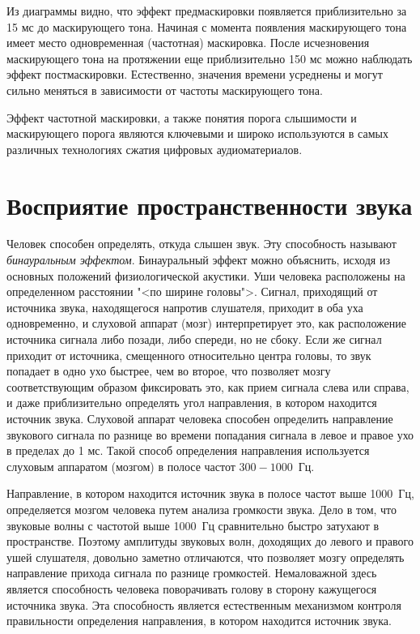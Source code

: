 \documentclass[oneside, final, 14pt]{extreport}
\begin{document}
Из диаграммы видно, что эффект предмаскировки появляется приблизительно за 15 мс до маскирующего тона. Начиная с момента появления маскирующего тона имеет место одновременная (частотная) маскировка. После исчезновения маскирующего тона на протяжении еще приблизительно 150 мс можно наблюдать эффект постмаскировки. Естественно, значения времени усреднены и могут сильно меняться в зависимости от частоты маскирующего тона.

Эффект частотной маскировки, а также понятия порога слышимости и маскирующего порога являются ключевыми и широко используются в самых различных технологиях сжатия цифровых аудиоматериалов.

\section{Восприятие пространственности звука}
Человек способен определять, откуда слышен звук. Эту способность называют {\itshape бинауральным эффектом}. Бинауральный эффект можно объяснить, исходя из основных положений физиологической акустики. Уши человека расположены на определенном расстоянии "<по ширине головы">. Сигнал, приходящий от источника звука, находящегося напротив слушателя, приходит в оба уха одновременно, и слуховой аппарат (мозг) интерпретирует это, как расположение источника сигнала либо позади, либо спереди, но не сбоку. Если же сигнал приходит от источника, смещенного относительно центра головы, то звук попадает в одно ухо быстрее, чем
во второе, что позволяет мозгу соответствующим образом фиксировать это, как прием сигнала слева или справа, и даже приблизительно определять угол направления, в котором находится источник звука. Слуховой аппарат человека способен определить направление звукового сигнала по разнице во времени попадания сигнала в левое и правое ухо в пределах до 1 мс. Такой способ определения направления используется слуховым аппаратом (мозгом) в полосе частот $300-1000$~Гц.

Направление, в котором находится источник звука в полосе частот выше 1000~Гц, определяется мозгом человека путем анализа громкости звука. Дело в том, что звуковые волны с частотой выше 1000~Гц сравнительно быстро затухают в пространстве. Поэтому амплитуды звуковых волн, доходящих до левого и правого ушей слушателя, довольно заметно отличаются, что позволяет мозгу определять направление прихода сигнала по разнице громкостей. Немаловажной здесь является способность человека поворачивать голову в сторону кажущегося источника звука. Эта способность является естественным механизмом контроля правильности определения направления, в котором находится источник звука.
\end{document}
